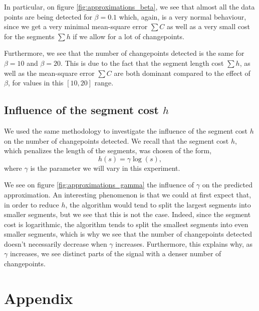 \documentclass[11pt]{article}
\begin{document}
In particular, on figure \ref{fig:approximations_beta}, we see that almost all the data points are being detected for $\beta=0.1$ which, again, is a very normal behaviour, since we get a very minimal mean-square error $\sum C$ as well as a very small cost for the segments $\sum h$ if we allow for a lot of changepoints.

Furthermore, we see that the number of changepoints detected is the same for $\beta = 10$ and $\beta = 20$. This is due to the fact that the segment length cost $\sum h$, as well as the mean-square error $\sum C$ are both dominant compared to the effect of $\beta$, for values in this $[10,20]$ range.

\subsection{Influence of the segment cost $h$}
We used the same methodology to investigate the influence of the segment cost $h$ on the number of changepoints detected. We recall that the segment cost $h$, which penalizes the length of the segments, was chosen of the form,
$$ h(s) = \gamma \log(s), $$ where $\gamma$ is the parameter we will vary in this experiment.

We see on figure \ref{fig:approximations_gamma} the influence of $\gamma$ on the predicted approximation. An interesting phenomenon is that we could at first expect that, in order to reduce $h$, the algorithm would tend to split the largest segments into smaller segments, but we see that this is not the case. Indeed, since the segment cost is logarithmic, the algorithm tends to split the smallest segments into even smaller segments, which is why we see that the number of changepoints detected doesn't necessarily decrease when $\gamma$ increases. Furthermore, this explains why, as $\gamma$ increases, we see distinct parts of the signal with a denser number of changepoints.




\newpage
\section{Appendix}
\end{document}
